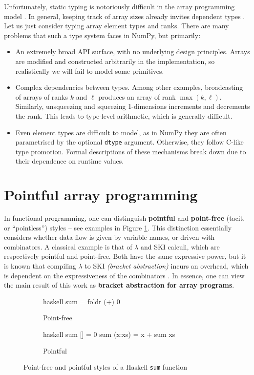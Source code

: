 Unfortunately, static typing is notoriously difficult in the array programming model \cite{liu2020type}. In general, keeping track of array sizes already invites dependent types \cite{henriksen2021towards}. Let us just consider typing array element types and ranks. There are many problems that such a type system faces in NumPy, but primarily:
\begin{itemize}
    \item An extremely broad API surface, with no underlying design principles. Arrays are modified and constructed arbitrarily in the implementation, so realistically we will fail to model some primitives.
    \item Complex dependencies between types. Among other examples, broadcasting of arrays of ranks $k$ and $\ell$ produces an array of rank $\max(k, \ell)$. Similarly, unsqueezing and squeezing 1-dimensions increments and decrements the rank. This leads to type-level arithmetic, which is generally difficult.
    \item Even element types are difficult to model, as in NumPy they are often parametrised by the optional \texttt{dtype} argument. Otherwise, they follow C-like type promotion. Formal descriptions of these mechanisms break down due to their  dependence on runtime values.
\end{itemize}

\section{Pointful array programming}
\label{pointful-array-programming}

In functional programming, one can distinguish \textbf{pointful} and \textbf{point-free} (tacit, or ``pointless'') styles -- see examples in Figure \ref{fig:point-haskell}. This distinction essentially considers whether data flow is given by variable names, or driven with combinators. A classical example is that of $\lambda$ and SKI calculi, which are respectively pointful and point-free. Both have the same expressive power, but it is known that compiling $\lambda$ to SKI \textit{(bracket abstraction)} incurs an overhead, which is dependent on the expressiveness of the combinators \cite{lachowski2018complexity}. 
In essence, one can view the main result of this work as \textbf{bracket abstraction for array programs}.

\begin{figure}[h]
\centering
\begin{subfigure}{.3\textwidth}
  \centering
    \begin{cminted}{haskell}
sum = foldr (+) 0
    \end{cminted}
      \caption{Point-free}
\end{subfigure}%
\begin{subfigure}{.3\textwidth}
  \centering
  \begin{cminted}{haskell}
sum [] = 0
sum (x:xs) = x + sum xs
  \end{cminted}
  \caption{Pointful}
\end{subfigure}
\caption{Point-free and pointful styles of a Haskell \texttt{sum} function}
\label{fig:point-haskell}
\end{figure}

